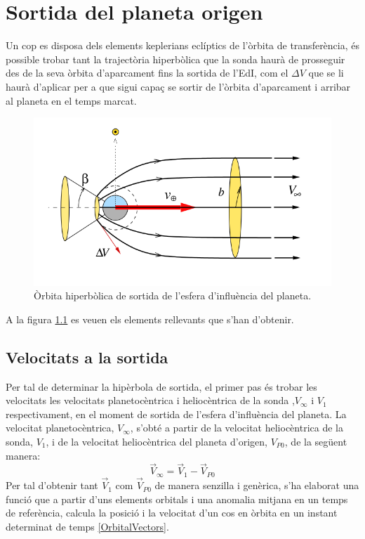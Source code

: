 \chapter{Sortida del planeta origen}
Un cop es disposa dels elements keplerians eclíptics de l'òrbita de transferència, és possible trobar tant la trajectòria hiperbòlica que la sonda haurà de prosseguir des de la seva òrbita d'aparcament fins la sortida de l'EdI, com el $\Delta V$ que se li haurà d'aplicar per a que sigui capaç se sortir de l'òrbita d'aparcament i arribar al planeta en el temps marcat.

\begin{figure}[H]
	\centering
	\includegraphics[scale=0.5]{./plots/hyperbola}
	\caption{Òrbita hiperbòlica de sortida de l'esfera d'influència del planeta.}
	\label{esquema_hyperbola}
\end{figure}
A la figura \ref{esquema_hyperbola} es veuen els elements rellevants que s'han d'obtenir.
\section{Velocitats a la sortida}
Per tal de determinar la hipèrbola de sortida, el primer pas és trobar les velocitats les velocitats planetocèntrica i heliocèntrica de la sonda ,$V_{\infty}$ i $V_1$ respectivament, en el moment de sortida de l'esfera d'influència del planeta. La velocitat planetocèntrica, $V_{\infty}$, s'obté a partir de la velocitat heliocèntrica de la sonda, $V_1$, i de la velocitat heliocèntrica del planeta d'origen, $V_{P0}$, de la següent manera:
\begin{equation}
\vec{V}_{\infty} = \vec{V}_{1} - \vec{V}_{P0}
\end{equation}
Per tal d'obtenir tant $\vec{V}_{1}$ com $\vec{V}_{P0}$ de manera senzilla i genèrica, s'ha elaborat una funció que a partir d'uns elements orbitals i una anomalia mitjana en un temps de referència, calcula la posició i la velocitat d'un cos en òrbita en un instant determinat de temps \ref{OrbitalVectors}.

